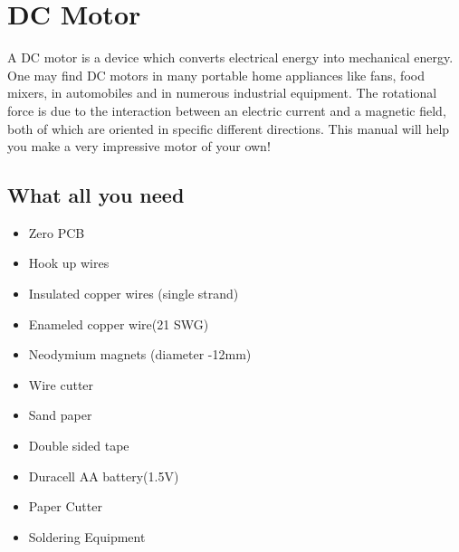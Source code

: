 \cleardoublepage
{} %

\chapter{DC Motor}
A DC motor is a device which converts electrical energy into mechanical
energy. One may find DC motors in many portable home appliances like
fans, food mixers, in automobiles and in numerous industrial equipment. The
rotational force is due to the interaction between an electric current and a
magnetic field, both of which are oriented in specific different directions.
This manual will help you make a very impressive motor of your own!

\section{What all you need}
\begin{itemize}
    \item Zero PCB
    \item Hook up wires
    \item Insulated copper wires (single strand)
    \item Enameled copper wire(21 SWG)
    \item Neodymium magnets (diameter -12mm)
    \item Wire cutter
    \item Sand paper
    \item Double sided tape
    \item Duracell AA battery(1.5V)
    \item Paper Cutter
    \item Soldering Equipment
\end{itemize}

